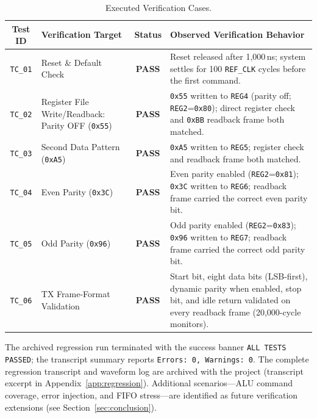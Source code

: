 \documentclass[11pt,a4paper]{article}
\begin{document}
\begin{table}[htbp]
\centering
\caption{Executed Verification Cases.}
\label{tab:testplan}
\small
\renewcommand{\arraystretch}{1.12}
\begin{tabularx}{\textwidth}{|c|l|c|Y|}
\hline
\textbf{Test ID} & \textbf{Verification Target} & \textbf{Status} & \textbf{Observed Verification Behavior} \\
\hline
\texttt{TC\_01} & Reset \& Default Check & \textcolor{successgreen}{\textbf{PASS}} & Reset released after 1,000\,ns; system settles for 100 \texttt{REF\_CLK} cycles before the first command. \\
\hline
\texttt{TC\_02} & Register File Write/Readback: Parity OFF (\texttt{0x55}) & \textcolor{successgreen}{\textbf{PASS}} & \texttt{0x55} written to \texttt{REG4} (parity off; \texttt{REG2}=\texttt{0x80}); direct register check and \texttt{0xBB} readback frame both matched. \\
\hline
\texttt{TC\_03} & Second Data Pattern (\texttt{0xA5}) & \textcolor{successgreen}{\textbf{PASS}} & \texttt{0xA5} written to \texttt{REG5}; register check and readback frame both matched. \\
\hline
\texttt{TC\_04} & Even Parity (\texttt{0x3C}) & \textcolor{successgreen}{\textbf{PASS}} & Even parity enabled (\texttt{REG2}=\texttt{0x81}); \texttt{0x3C} written to \texttt{REG6}; readback frame carried the correct even parity bit. \\
\hline
\texttt{TC\_05} & Odd Parity (\texttt{0x96}) & \textcolor{successgreen}{\textbf{PASS}} & Odd parity enabled (\texttt{REG2}=\texttt{0x83}); \texttt{0x96} written to \texttt{REG7}; readback frame carried the correct odd parity bit. \\
\hline
\texttt{TC\_06} & TX Frame-Format Validation & \textcolor{successgreen}{\textbf{PASS}} & Start bit, eight data bits (LSB-first), dynamic parity when enabled, stop bit, and idle return validated on every readback frame (20,000-cycle monitors). \\
\hline
\end{tabularx}
\end{table}

The archived regression run terminated with the success banner \texttt{ALL TESTS PASSED}; the transcript summary reports \texttt{Errors: 0, Warnings: 0}. The complete regression transcript and waveform log are archived with the project (transcript excerpt in Appendix~\ref{app:regression}). Additional scenarios---ALU command coverage, error injection, and FIFO stress---are identified as future verification extensions (see Section~\ref{sec:conclusion}).
\end{document}
